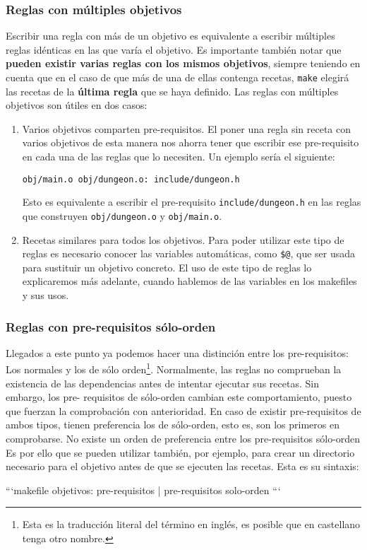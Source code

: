 \documentclass[11pt,twoside,titlepage,a4paper]{article}
\theoremstyle{definition}
\theoremstyle{plain_rojo}
\theoremstyle{remark}
\begin{document}
\subsubsection{Reglas con múltiples objetivos}

Escribir una regla con más de un objetivo es equivalente a escribir múltiples 
reglas idénticas en las que varía el objetivo. Es importante también notar 
que \textbf{pueden existir varias reglas con los mismos objetivos}, siempre 
teniendo en cuenta que en el caso de que más de una de ellas contenga 
recetas, \texttt{make} elegirá las recetas de la \textbf{última regla} que se 
haya definido. Las reglas con múltiples objetivos son útiles en dos casos:

\begin{enumerate}[font={\color{rojooscuro}\bfseries}]
	\item Varios objetivos comparten pre-requisitos. El poner una regla sin
	receta con varios objetivos de esta manera nos ahorra tener que escribir 
	ese pre-requisito en cada una de las reglas que lo necesiten. Un ejemplo
	sería el siguiente:
\begin{lstlisting}
obj/main.o obj/dungeon.o: include/dungeon.h
\end{lstlisting}
	Esto es equivalente a escribir el pre-requisito \texttt{include/dungeon.h}
	en las reglas que construyen \texttt{obj/dungeon.o} y \texttt{obj/main.o}.
	\item Recetas similares para todos los objetivos. Para poder utilizar
	este tipo de reglas es necesario conocer las variables automáticas, como
	\texttt{\$@}, que ser usada para sustituir un objetivo concreto. El uso 
	de este tipo de reglas lo explicaremos más adelante, cuando hablemos de 
	las variables en los makefiles y sus usos.
\end{enumerate}

\subsubsection{Reglas con pre-requisitos sólo-orden}

Llegados a este punto ya podemos hacer una distinción entre los 
pre-requisitos: Los normales y los de sólo orden\footnote{Esta es la 
traducción literal del término en inglés, es posible que en castellano tenga 
otro nombre.}. Normalmente, las reglas no comprueban la existencia de las 
dependencias antes de intentar ejecutar sus recetas. Sin embargo, los pre-
requisitos de sólo-orden cambian este comportamiento, puesto que fuerzan la 
comprobación con anterioridad. En caso de existir pre-requisitos de ambos 
tipos, tienen preferencia los de sólo-orden, esto es, son los primeros en 
comprobarse. No existe un orden de preferencia entre los pre-requisitos 
sólo-orden Es por ello que se pueden utilizar también, por ejemplo, para crear un 
directorio necesario para el objetivo antes de que se ejecuten las recetas. 
Esta es su sintaxis:

```makefile
objetivos: pre-requisitos | pre-requisitos solo-orden
```
\end{document}
